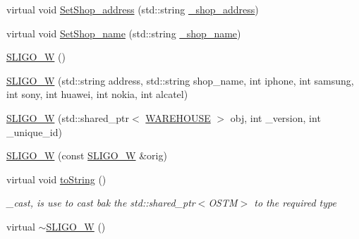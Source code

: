 \begin{DoxyCompactItemize}
\item 
virtual void \hyperlink{class_s_l_i_g_o___w_af442340c69e1f50622014d459320f003_af442340c69e1f50622014d459320f003}{Set\+Shop\+\_\+address} (std\+::string \hyperlink{class_s_l_i_g_o___w_ade08b79101c67997dde54515f2088b9d_ade08b79101c67997dde54515f2088b9d}{\+\_\+shop\+\_\+address})
\item 
virtual void \hyperlink{class_s_l_i_g_o___w_ad2a9668f07e63bed2bb5da576cbb55b7_ad2a9668f07e63bed2bb5da576cbb55b7}{Set\+Shop\+\_\+name} (std\+::string \hyperlink{class_s_l_i_g_o___w_a01bebef43ff4b4d9d728489f05b94d86_a01bebef43ff4b4d9d728489f05b94d86}{\+\_\+shop\+\_\+name})
\item 
\hyperlink{class_s_l_i_g_o___w_a9b669809dc7cf8d9982181ac7997b0da_a9b669809dc7cf8d9982181ac7997b0da}{S\+L\+I\+G\+O\+\_\+W} ()
\item 
\hyperlink{class_s_l_i_g_o___w_aced291d99970ff1c2f2146256f400788_aced291d99970ff1c2f2146256f400788}{S\+L\+I\+G\+O\+\_\+W} (std\+::string address, std\+::string shop\+\_\+name, int iphone, int samsung, int sony, int huawei, int nokia, int alcatel)
\item 
\hyperlink{class_s_l_i_g_o___w_a5a969bbfbb08f8a5d29f766288f2f7e6_a5a969bbfbb08f8a5d29f766288f2f7e6}{S\+L\+I\+G\+O\+\_\+W} (std\+::shared\+\_\+ptr$<$ \hyperlink{class_w_a_r_e_h_o_u_s_e}{W\+A\+R\+E\+H\+O\+U\+SE} $>$ obj, int \+\_\+version, int \+\_\+unique\+\_\+id)
\item 
\hyperlink{class_s_l_i_g_o___w_abd92acb0451fe449fbdb7c3c2a6701b7_abd92acb0451fe449fbdb7c3c2a6701b7}{S\+L\+I\+G\+O\+\_\+W} (const \hyperlink{class_s_l_i_g_o___w}{S\+L\+I\+G\+O\+\_\+W} \&orig)
\item 
virtual void \hyperlink{class_s_l_i_g_o___w_a8f49deaa85f48ff29dd8cdeb7c9dda56_a8f49deaa85f48ff29dd8cdeb7c9dda56}{to\+String} ()
\begin{DoxyCompactList}\small\item\em \+\_\+cast, is use to cast bak the std\+::shared\+\_\+ptr$<$\+O\+S\+T\+M$>$ to the required type \end{DoxyCompactList}\item 
virtual \hyperlink{class_s_l_i_g_o___w_aa6cc833af07309dee5eb2493cddf443c_aa6cc833af07309dee5eb2493cddf443c}{$\sim$\+S\+L\+I\+G\+O\+\_\+W} ()
\end{DoxyCompactItemize}
